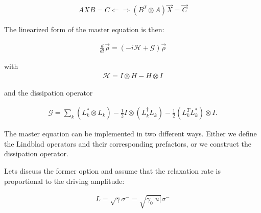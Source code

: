 \documentclass[letterpaper,10pt,english]{sphinxmanual}
\begin{document}
\begin{align}
AXB = C \Leftarrow \Rightarrow (B^T \otimes A) \vec{X} = \vec{C}
\end{align}

The linearized form of the master equation is then:

\begin{align}
\frac{d}{dt} \vec{\rho} = (-i \mathcal{H} + \mathcal{G}) \vec{\rho}
\end{align}

with \begin{align}
\mathcal{H} = I \otimes H - H \otimes I
\end{align}

and the dissipation operator

\begin{align}
\mathcal{G} = \sum_k (L^\ast_k \otimes L_k)
- \frac{1}{2} I \otimes (L_k^\dagger L_k)
- \frac{1}{2} ( L_k^T L_k^\ast ) \otimes I.
\end{align}

The master equation can be implemented in two different ways. Either we define the Lindblad operators and their corresponding prefactors, or we construct the dissipation operator.

Lets discuss the former option and assume that the relaxation rate is proportional to the driving amplitude:

\begin{align}
L = \sqrt{\gamma} \sigma^- = \sqrt{\gamma_0 \vert u \vert} \sigma^-
\end{align}

{
\begin{sphinxVerbatim}[commandchars=\\\{\}]
\llap{\color{nbsphinxin}[2]:\,\hspace{\fboxrule}\hspace{\fboxsep}}  \PYG{p}{[} \PYG{p}{]}
  

 
       
          


 
        
\end{sphinxVerbatim}
}
\end{document}
